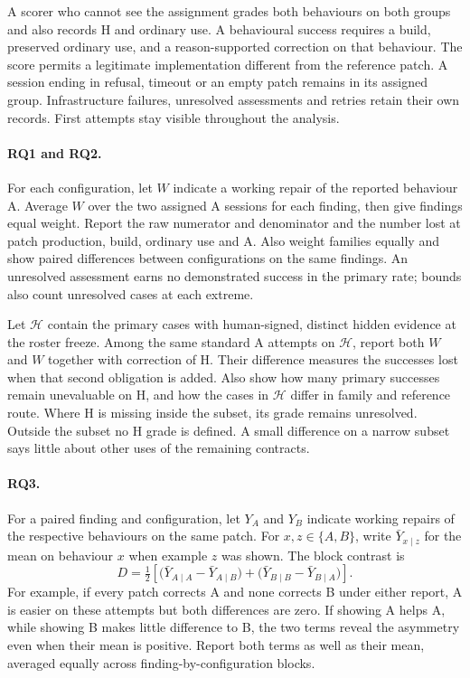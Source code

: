 A scorer who cannot see the assignment grades both behaviours on both groups and also records H and ordinary use. A behavioural success requires a build, preserved ordinary use, and a reason-supported correction on that behaviour. The score permits a legitimate implementation different from the reference patch. A session ending in refusal, timeout or an empty patch remains in its assigned group. Infrastructure failures, unresolved assessments and retries retain their own records. First attempts stay visible throughout the analysis.

\paragraph{RQ1 and RQ2.}
For each configuration, let \(W\) indicate a working repair of the reported behaviour A. Average \(W\) over the two assigned A sessions for each finding, then give findings equal weight. Report the raw numerator and denominator and the number lost at patch production, build, ordinary use and A. Also weight families equally and show paired differences between configurations on the same findings. An unresolved assessment earns no demonstrated success in the primary rate; bounds also count unresolved cases at each extreme.

Let \(\mathcal{H}\) contain the primary cases with human-signed, distinct hidden evidence at the roster freeze. Among the same standard A attempts on \(\mathcal{H}\), report both \(W\) and \(W\) together with correction of H. Their difference measures the successes lost when that second obligation is added. Also show how many primary successes remain unevaluable on H, and how the cases in \(\mathcal{H}\) differ in family and reference route. Where H is missing inside the subset, its grade remains unresolved. Outside the subset no H grade is defined. A small difference on a narrow subset says little about other uses of the remaining contracts.

\paragraph{RQ3.}
For a paired finding and configuration, let \(Y_A\) and \(Y_B\) indicate working repairs of the respective behaviours on the same patch. For \(x,z\in\{A,B\}\), write \(\bar Y_{x\mid z}\) for the mean on behaviour \(x\) when example \(z\) was shown. The block contrast is
\begin{equation}
D = \tfrac{1}{2}\left[
  \big(\bar Y_{A\mid A}-\bar Y_{A\mid B}\big)
  +\big(\bar Y_{B\mid B}-\bar Y_{B\mid A}\big)\right].
\label{eq:contrast}
\end{equation}
For example, if every patch corrects A and none corrects B under either report, A is easier on these attempts but both differences are zero. If showing A helps A, while showing B makes little difference to B, the two terms reveal the asymmetry even when their mean is positive. Report both terms as well as their mean, averaged equally across finding-by-configuration blocks.

